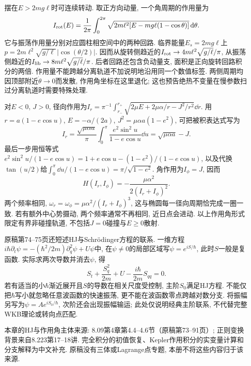 摆在$E>2mg\ell$时可连续转动. 取正方向动量, 一个角周期的作用量为
\[
I_{\rm rot}(E)=\frac1{2\pi}\int_0^{2\pi}
\sqrt{2m\ell^2[E-mg\ell(1-\cos\theta)]}\,\mathrm d\theta.
\]
它与振荡作用量分别对应圆柱相空间中的两种回路. 临界能量$E_s=2mg\ell$上$p=2m\ell^2\sqrt{g/\ell}\,|\cos(\theta/2)|$. 因而从旋转侧趋近的$I_{\rm rot}\to4m\ell^2\sqrt{g/\ell}/\pi$, 从振荡侧趋近的$I_{\rm lib}\to8m\ell^2\sqrt{g/\ell}/\pi$. 后者回路还包含负动量支, 面积是正向旋转回路积分的两倍. 作用量不能跨越分离轨道不加说明地沿用同一个数值标签. 两侧周期均因顶部附近$\dot\theta\to0$而发散, 作用角坐标在这里退化; 这也预告绝热不变量在慢参数扫过分离轨道时需要特殊处理.

对$E<0$, $J>0$, 径向作用为$I_r=\pi^{-1}\int_{r_-}^{r_+}\sqrt{2\mu E+2\mu\alpha/r-J^2/r^2}\dd r$. 用$r=a(1-e\cos u)$, $E=-\alpha/(2a)$, $J^2=\mu\alpha a(1-e^2)$, 可把被积表达式写为
\[
I_r=\frac{\sqrt{\mu\alpha a}}{\pi}\int_0^\pi
\frac{e^2\sin^2u}{1-e\cos u}\dd u
=\sqrt{\mu\alpha a}-J.
\]
最后一步用恒等式$e^2\sin^2u/(1-e\cos u)=1+e\cos u-(1-e^2)/(1-e\cos u)$, 以及代换$\tan(u/2)$给$\int_0^\pi\dd u/(1-e\cos u)=\pi/\sqrt{1-e^2}$. 角作用为$I_\phi=J$, 因而
\[
H(I_r,I_\phi)=-\frac{\mu\alpha^2}{2(I_r+I_\phi)^2}.
\]
两个频率相同, $\omega_r=\omega_\phi=\mu\alpha^2/(I_r+I_\phi)^3$, 这与椭圆每一径向周期恰完成一圈一致. 若有额外中心势摄动, 两个频率通常不再相同, 近日点会进动. 以上作用角形式限定有界非碰撞轨道, 不包括$J=0$碰撞与$E\ge0$散射.



原稿第74--75页还短述HJ与Schrödinger方程的联系. 一维方程$i\hbar\partial_t\psi=-(\hbar^2/2m)\partial_q^2\psi+U\psi$中, 在$\psi\ne0$的局部区域写$\psi=e^{iS/\hbar}$, 此时$S$一般是复函数. 实际求两次导数并消去$\psi$, 得
\[
S_t+\frac{S_q^2}{2m}+U-\frac{i\hbar}{2m}S_{qq}=0.
\]
若有适当的小$\hbar$渐近展开且$S$的导数在相关尺度受控制, 主阶$S_0$满足HJ方程. 不能仅把$\hbar$写小就忽略任意波函数的快速振荡, 更不能在波函数零点跨越对数分支. 将振幅另写为$\psi=Ae^{iS_0/\hbar}$, 次阶还会出现振幅输运; 此处仅说明经典主阶联系, 不代替完整WKB理论或转向点匹配.

本章的HJ与作用角主体来源: 8.09第4章第4.4--4.6节（原稿第73--91页）; 正则变换背景来自8.223第17--18讲. 完全积分的初值恢复、Kepler作用积分的实变量计算和分支解释为中文补充. 原稿没有三体或Lagrange点专题, 本册不将这些内容归于该来源.
